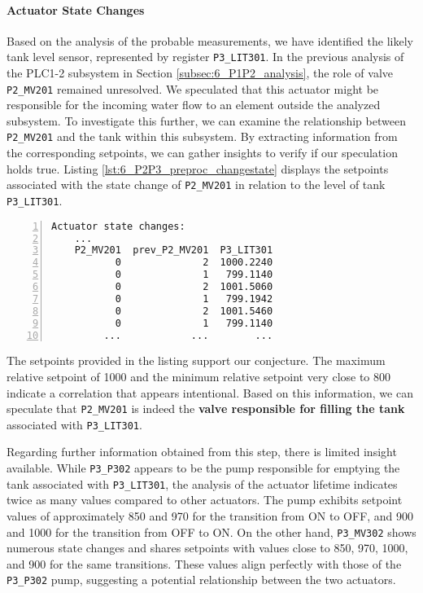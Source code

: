 \paragraph{Actuator State Changes}
\label{par:6_preproc_P2P3_actuator_state_changes}
Based on the analysis of the probable measurements, we have identified the likely tank level sensor, represented by register \texttt{P3\_LIT301}. In the previous analysis of the PLC1-2 subsystem in Section \ref{subsec:6_P1P2_analysis}, the role of valve \texttt{P2\_MV201} remained unresolved. We speculated that this actuator might be responsible for the incoming water flow to an element outside the analyzed subsystem. To investigate this further, we can examine the relationship between \texttt{P2\_MV201} and the tank within this subsystem. By extracting information from the corresponding setpoints, we can gather insights to verify if our speculation holds true. \newline 
Listing \ref{lst:6_P2P3_preproc_changestate} displays the setpoints associated with the state change of \texttt{P2\_MV201} in relation to the level of tank \texttt{P3\_LIT301}.

\begin{lstlisting}[language=bash, numbers=left, caption=\texttt{P2\_MV201} state changes in relation to \texttt{P3\_LIT301}, label=lst:6_P2P3_preproc_changestate]
	Actuator state changes:
	...
	P2_MV201  prev_P2_MV201  P3_LIT301
	       0              2  1000.2240
	       0              1   799.1140
	       0              2  1001.5060
	       0              1   799.1942
	       0              2  1001.5460
	       0              1   799.1140
	     ...            ...        ...
\end{lstlisting}

The setpoints provided in the listing support our conjecture. The maximum relative setpoint of 1000 and the minimum relative setpoint very close to 800 indicate a correlation that appears intentional. Based on this information, we can speculate that \texttt{P2\_MV201} is indeed the \textbf{valve responsible for filling the tank} associated with \texttt{P3\_LIT301}.

\bigskip
Regarding further information obtained from this step, there is limited insight available. While \texttt{P3\_P302} appears to be the pump responsible for emptying the tank associated with \texttt{P3\_LIT301}, the analysis of the actuator lifetime indicates twice as many values compared to other actuators. The pump exhibits setpoint values of approximately 850 and 970 for the transition from ON to OFF, and 900 and 1000 for the transition from OFF to ON. On the other hand, \texttt{P3\_MV302} shows numerous state changes and shares setpoints with values close to 850, 970, 1000, and 900 for the same transitions. These values align perfectly with those of the \texttt{P3\_P302} pump, suggesting a potential relationship between the two actuators.


